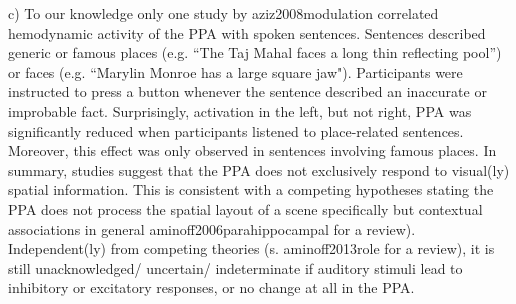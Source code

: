 \documentclass[english]{article}
\begin{document}
c) To our knowledge only one study by {aziz2008modulation} correlated hemodynamic activity of the PPA with spoken sentences. Sentences described generic or famous places (e.g. “The Taj Mahal faces a long thin reflecting pool”) or faces  (e.g. “Marylin Monroe has a large square jaw"). Participants were instructed to press a button whenever the sentence described an inaccurate or improbable fact. Surprisingly, activation in the left, but not right, PPA was significantly reduced  when participants listened to place-related sentences. Moreover, this effect was only observed in sentences involving famous places.
In summary, studies suggest that the PPA does not exclusively respond to visual(ly) spatial information. This is consistent with a competing hypotheses stating the PPA does not process the spatial layout of a scene specifically but contextual associations in general {aminoff2006parahippocampal} for a review). Independent(ly) from competing theories (s. {aminoff2013role} for a review), it is still unacknowledged/ uncertain/ indeterminate if auditory stimuli lead to inhibitory or excitatory responses, or no change at all in the PPA.
\end{document}
